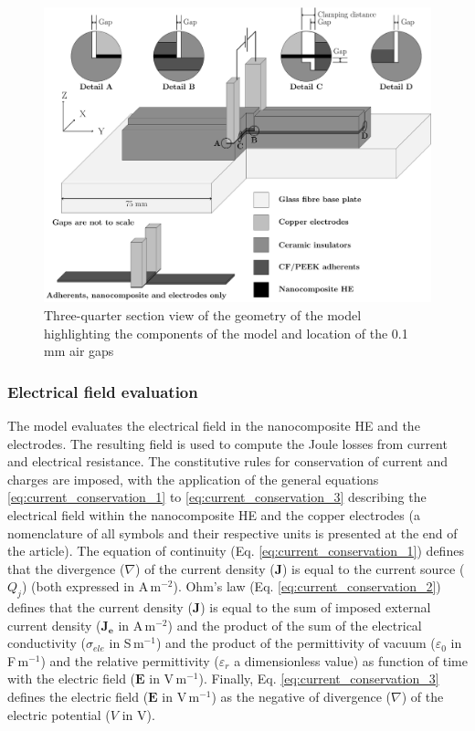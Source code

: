 \documentclass[review,times,sagev,doublespace]{sagej}
\begin{document}
\begin{figure}[ht]
	\center
	\includegraphics[width=\textwidth]{Fig2}
	\caption{Three-quarter section view of the geometry of the model highlighting the components of the model and location of the 0.1 mm air gaps \cite{Brassard2019b}}
	\label{fig:Fig2}
\end{figure} 

\FloatBarrier
		\subsubsection{Electrical field evaluation}

The model evaluates the electrical field in the nanocomposite HE and the electrodes. 
The resulting field is used to compute the {J}oule losses from current and electrical resistance. 
The constitutive rules for conservation of current and charges are imposed, with the application of the general equations \ref{eq:current_conservation_1} to \ref{eq:current_conservation_3} describing the electrical field within the nanocomposite HE and the copper electrodes {(a nomenclature of all symbols and their respective units is presented at the end of the article)}. 
The equation of continuity (Eq. \ref{eq:current_conservation_1}) defines that the divergence ($\nabla$) of the current density ($\mathbf{J}$) is equal to the current source ($Q_j$) (both expressed in \mbox{A\,m$^{-2}$}). 
Ohm’s law (Eq. \ref{eq:current_conservation_2}) defines that the current density ($\mathbf{J}$) is equal to the sum of imposed external current density ($\mathbf{J_e}$ in \mbox{A\,m$^{-2}$}) and the product of the sum of the electrical conductivity ($\sigma_{ele}$ in \mbox{S\,m$^{-1}$}) and the product of the permittivity of vacuum ($\varepsilon_0$ in \mbox{F\,m$^{-1}$}) and the relative permittivity ($\varepsilon_r$ a dimensionless value) as function of time with the electric field ($\mathbf{E}$ in \mbox{V\,m$^{-1}$}). 
Finally, Eq. \ref{eq:current_conservation_3} defines the electric field ($\mathbf{E}$ in \mbox{V\,m$^{-1}$}) as the negative of divergence ($\nabla$) of the electric potential ($V$ in V). 
\end{document}
